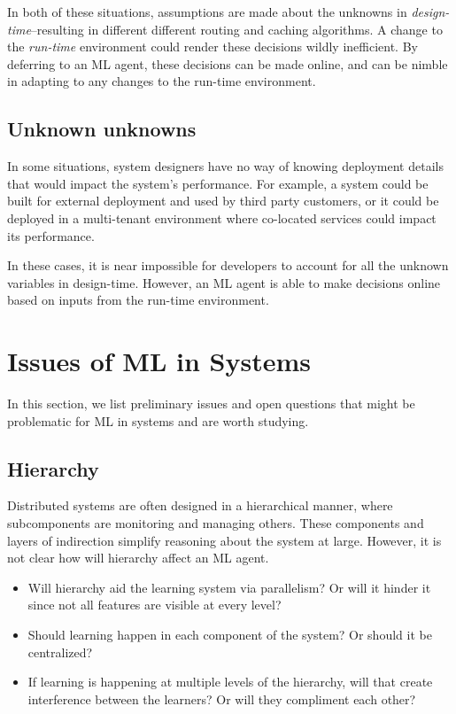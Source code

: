 \documentclass[a4paper,twocolumn]{article}
\begin{document}
In both of these situations, assumptions are made about the unknowns in
\emph{design-time}--resulting in different different routing and caching
algorithms. A change to the \emph{run-time} environment could render these
decisions wildly inefficient. By deferring to an ML agent, these decisions can
be made online, and can be nimble in adapting to any changes to the run-time
environment.

\subsection{Unknown unknowns}
In some situations, system designers have no way of knowing deployment details
that would impact the system's performance. For example, a system could be built
for external deployment and used by third party customers, or it could be
deployed in a multi-tenant environment where co-located services could impact
its performance.

In these cases, it is near impossible for developers to account for all the
unknown variables in design-time. However, an ML agent is able to make decisions
online based on inputs from the run-time environment.


\section{Issues of ML in Systems}

In this section, we list preliminary issues and open questions that might be
problematic for ML in systems and are worth studying.

\subsection{Hierarchy}
Distributed systems are often designed in a hierarchical manner, where
subcomponents are monitoring and managing others. These components and layers of
indirection simplify reasoning about the system at large. However, it is not
clear how will hierarchy affect an ML agent.
\begin{itemize}
  \item Will hierarchy aid the learning system via parallelism? Or will it hinder
    it since not all features are visible at every level?
  \item Should learning happen in each component of the system? Or should it be
    centralized?
  \item If learning is happening at multiple levels of the hierarchy, will that
    create interference between the learners? Or will they compliment each
    other?
\end{itemize}
\end{document}
